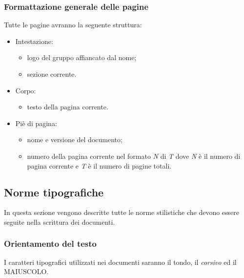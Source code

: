 \subsubsection{Formattazione generale delle pagine}
Tutte le pagine avranno la seguente struttura:
\begin{itemize}
	\item Intestazione:
	\begin{itemize}
		\item logo del gruppo affiancato dal nome;
		\item sezione corrente.
	\end{itemize}
		\item Corpo:
		\begin{itemize}
			\item testo della pagina corrente.
		\end{itemize}
	\item Piè di pagina:
	\begin{itemize}
		\item nome e versione del documento;
		\item numero della pagina corrente nel formato \textit{N} di \textit{T} dove \textit{N} è il numero di pagina corrente e \textit{T} è il numero di pagine totali.
	\end{itemize}
\end{itemize}

\subsection{Norme tipografiche}
In questa sezione vengono descritte tutte le norme stilistiche che devono essere seguite nella scrittura dei documenti.

\subsubsection{Orientamento del testo}
I caratteri tipografici utilizzati nei documenti saranno il tondo, il \textit{corsivo} ed il MAIUSCOLO.

